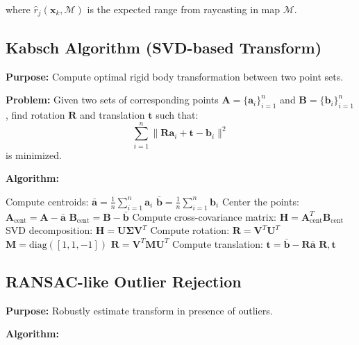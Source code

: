 \documentclass[11pt]{article}
\begin{document}
where $\hat{r}_j(\mathbf{x}_k, \mathcal{M})$ is the expected range from raycasting in map $\mathcal{M}$.

\subsection{Kabsch Algorithm (SVD-based Transform)}

\textbf{Purpose:} Compute optimal rigid body transformation between two point sets.

\textbf{Problem:} Given two sets of corresponding points $\mathbf{A} = \{\mathbf{a}_i\}_{i=1}^n$ and $\mathbf{B} = \{\mathbf{b}_i\}_{i=1}^n$, find rotation $\mathbf{R}$ and translation $\mathbf{t}$ such that:
\[
\sum_{i=1}^n \|\mathbf{R} \mathbf{a}_i + \mathbf{t} - \mathbf{b}_i\|^2
\]
is minimized.

\textbf{Algorithm:}

\begin{algorithm}[H]
\caption{Kabsch Algorithm}
\begin{algorithmic}[1]
\State Compute centroids:
    \State $\bar{\mathbf{a}} = \frac{1}{n}\sum_{i=1}^n \mathbf{a}_i$
    \State $\bar{\mathbf{b}} = \frac{1}{n}\sum_{i=1}^n \mathbf{b}_i$
\State Center the points:
    \State $\mathbf{A}_{\text{cent}} = \mathbf{A} - \bar{\mathbf{a}}$
    \State $\mathbf{B}_{\text{cent}} = \mathbf{B} - \bar{\mathbf{b}}$
\State Compute cross-covariance matrix:
    \State $\mathbf{H} = \mathbf{A}_{\text{cent}}^T \mathbf{B}_{\text{cent}}$
\State SVD decomposition:
    \State $\mathbf{H} = \mathbf{U} \mathbf{\Sigma} \mathbf{V}^T$
\State Compute rotation:
    \State $\mathbf{R} = \mathbf{V}^T \mathbf{U}^T$
        \State $\mathbf{M} = \text{diag}([1, 1, -1])$ 
        \State $\mathbf{R} = \mathbf{V}^T \mathbf{M} \mathbf{U}^T$
    \EndIf
\State Compute translation:
    \State $\mathbf{t} = \bar{\mathbf{b}} - \mathbf{R} \bar{\mathbf{a}}$
\State \Return $\mathbf{R}, \mathbf{t}$
\end{algorithmic}
\end{algorithm}

\subsection{RANSAC-like Outlier Rejection}

\textbf{Purpose:} Robustly estimate transform in presence of outliers.

\textbf{Algorithm:}
\end{document}
